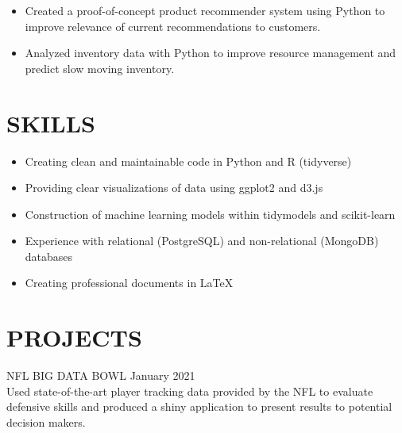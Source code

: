 \documentclass[11pt]{res} %
\begin{document}
\begin{resume}
\begin{itemize}
	\item Created a proof-of-concept product recommender system using Python to improve relevance of current recommendations to customers.
	\item Analyzed inventory data with Python to improve resource management and predict slow moving inventory.
\end{itemize}



\vspace{-0.2in}
\hrulefill
\vspace{-0.2in}  
\section{SKILLS}

\begin{itemize} 
	\item Creating clean and maintainable code in Python and R (tidyverse)
	\item Providing clear visualizations of data using ggplot2 and d3.js
	\item Construction of machine learning models within tidymodels and scikit-learn
	\item Experience with relational (PostgreSQL) and non-relational (MongoDB) databases
	\item Creating professional documents in \LaTeX
\end{itemize}

\vspace{-0.2in}
\hrulefill
\vspace{-0.2in}  

\section{PROJECTS}
\begin{hangparas}{.25in}{1}
NFL BIG DATA BOWL \hfill January 2021 \\
Used state-of-the-art player tracking data provided by the NFL to evaluate defensive skills and produced a shiny application to present results to potential decision makers.
	\vspace{-0.15in}  
	


\end{hangparas}
\end{resume}
\end{document}
